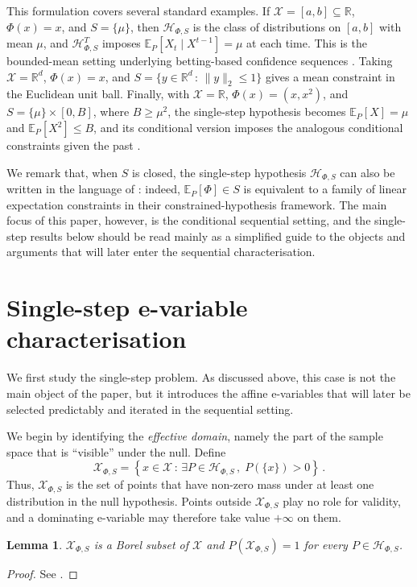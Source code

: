 \documentclass[10pt, a4paper]{article}
\newcommand{\E}{\mathbb E}
\newcommand{\Hh}{\mathcal H}
\newcommand{\HhP}{\Hh_{\Phi,S}}
\newcommand{\R}{\mathbb R}
\newcommand{\X}{\mathcal X}
\newcommand{\XP}{\X_{\Phi,S}}
\newtheorem{lemma}{Lemma}
\begin{document}
This formulation covers several standard examples. If $\X=[a,b]\subseteq\R$, $\Phi(x)=x$, and $S=\{\mu\}$, then $\HhP$ is the class of distributions on $[a,b]$ with mean $\mu$, and $\HhP^T$ imposes $\E_P[X_t\mid X^{t-1}]=\mu$ at each time. This is the bounded-mean setting underlying betting-based confidence sequences \citep{orabona2024tight,waudby2024estimating}. Taking $\X=\R^d$, $\Phi(x)=x$, and $S=\{y\in\R^d\,:\,\|y\|_2\leq 1\}$ gives a mean constraint in the Euclidean unit ball. Finally, with $\X=\R$, $\Phi(x)=(x,x^2)$, and $S=\{\mu\}\times[0,B]$, where $B\geq\mu^2$, the single-step hypothesis becomes $\E_P[X]=\mu$ and $\E_P[X^2]\leq B$, and its conditional version imposes the analogous conditional constraints given the past \citep{agrawal2021regret,wang2023catoni}. 

We remark that, when $S$ is closed, the single-step hypothesis $\HhP$ can also be written in the language of \citet{larsson2026testing}: indeed, $\E_P[\Phi]\in S$ is equivalent to a family of linear expectation constraints in their constrained-hypothesis framework. The main focus of this paper, however, is the conditional sequential setting, and the single-step results below should be read mainly as a simplified guide to the objects and arguments that will later enter the sequential characterisation.

\section{Single-step e-variable characterisation}

We first study the single-step problem. As discussed above, this case is not the main object of the paper, but it introduces the affine e-variables that will later be selected predictably and iterated in the sequential setting.

We begin by identifying the \emph{effective domain}, namely the part of the sample space that is ``visible'' under the null. Define
$$\XP = \left\{x\in\X\,:\,\exists P\in\HhP\,,\;P(\{x\})>0\right\}\,.$$
Thus, $\XP$ is the set of points that have non-zero mass under at least one distribution in the null hypothesis. Points outside $\XP$ play no role for validity, and a dominating e-variable may therefore take value $+\infty$ on them.

\begin{lemma}\label{lemma:XP}
    $\XP$ is a Borel subset of $\X$ and $P(\XP)=1$ for every $P\in\HhP$. 
\end{lemma}
\begin{proof}
    See .
\end{proof}
\end{document}

